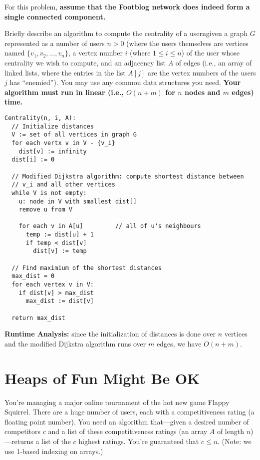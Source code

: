 \documentclass[11pt, oneside]{article}   	%
\theoremstyle{definition}
\theoremstyle{remark}
\begin{document}
For this problem, \textbf{assume that the Footblog network does indeed form a single connected component.}

Briefly describe an algorithm to compute the centrality of a userngiven a graph $G$ represented as a number of users $n > 0$ (where the users themselves are vertices named $\{v_1, v_2, \ldots, v_n\}$, a vertex number $i$ (where $1 \leq i \leq n$) of the user whose centrality we wish to compute, and an adjacency list $A$ of edges (i.e., an array of linked lists, where the entries in the list $A[j]$ are the vertex numbers of the users $j$ has ``enemied''). You may use any common data structures you need. \textbf{Your algorithm must run in linear (i.e., $O(n + m)$ for $n$ nodes and $m$ edges) time.}

\begin{verbatim}
Centrality(n, i, A):
  // Initialize distances
  V := set of all vertices in graph G
  for each vertx v in V - {v_i}
    dist[v] := infinity
  dist[i] := 0
  
  // Modified Dijkstra algorithm: compute shortest distance between
  // v_i and all other vertices
  while V is not empty:
    u: node in V with smallest dist[]
    remove u from V
    
    for each v in A[u]		   // all of u's neighbours
      temp := dist[u] + 1
      if temp < dist[v]
        dist[v] := temp
  
  // Find maximium of the shortest distances
  max_dist = 0
  for each vertex v in V:
    if dist[v] > max_dist
      max_dist := dist[v]
    
  return max_dist
\end{verbatim}

\textbf{Runtime Analysis:} since the initialization of distances is done over $n$ vertices and the modified Dijkstra algorithm runs over $m$ edges, we have $O(n+m)$.


\cleardoublepage
\section{Heaps of Fun Might Be OK}

You're managing a major online tournament of the hot new game Flappy
Squirrel. There are a huge number of users, each with a
competitiveness rating (a floating point number). You need an
algorithm that---given a desired number of competitors $c$ and a list
of these competitiveness ratings (an array $A$ of length
$n$)---returns a list of the $c$ highest ratings. You're guaranteed
that $c \leq n$. (Note: we use 1-based indexing on arrays.)
\end{document}

